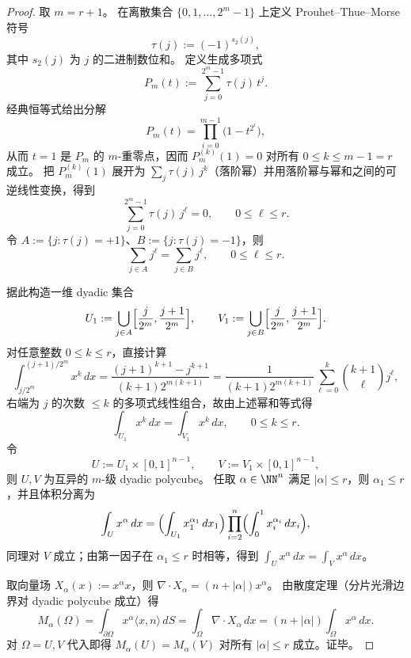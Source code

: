 \begin{proof}
取 \(m=r+1\)。
在离散集合 \(\{0,1,\dots,2^m-1\}\) 上定义 Prouhet--Thue--Morse 符号
\[
\tau(j):=(-1)^{s_2(j)},
\]
其中 \(s_2(j)\) 为 \(j\) 的二进制数位和。
定义生成多项式
\[
P_m(t):=\sum_{j=0}^{2^m-1}\tau(j)\,t^j.
\]
经典恒等式给出分解
\[
P_m(t)=\prod_{i=0}^{m-1}\bigl(1-t^{2^i}\bigr),
\]
从而 \(t=1\) 是 \(P_m\) 的 \(m\)-重零点，因而 \(P_m^{(k)}(1)=0\) 对所有 \(0\le k\le m-1=r\) 成立。
把 \(P_m^{(k)}(1)\) 展开为 \(\sum_j \tau(j)\,j^{\underline{k}}\)（落阶幂）并用落阶幂与幂和之间的可逆线性变换，得到
\[
\sum_{j=0}^{2^m-1}\tau(j)\,j^\ell=0,
\qquad 0\le \ell\le r.
\]
令 \(A:=\{j:\tau(j)=+1\}\)、\(B:=\{j:\tau(j)=-1\}\)，则
\[
\sum_{j\in A}j^\ell=\sum_{j\in B}j^\ell,\qquad 0\le \ell\le r.
\]
\par
据此构造一维 dyadic 集合
\[
U_1:=\bigcup_{j\in A}\Bigl[\frac{j}{2^m},\frac{j+1}{2^m}\Bigr],
\qquad
V_1:=\bigcup_{j\in B}\Bigl[\frac{j}{2^m},\frac{j+1}{2^m}\Bigr].
\]
对任意整数 \(0\le k\le r\)，直接计算
\[
\int_{j/2^m}^{(j+1)/2^m} x^k\,dx
=\frac{(j+1)^{k+1}-j^{k+1}}{(k+1)2^{m(k+1)}}
=\frac{1}{(k+1)2^{m(k+1)}}\sum_{\ell=0}^{k}\binom{k+1}{\ell}j^\ell,
\]
右端为 \(j\) 的次数 \(\le k\) 的多项式线性组合，故由上述幂和等式得
\[
\int_{U_1} x^k\,dx=\int_{V_1} x^k\,dx,\qquad 0\le k\le r.
\]
令
\[
U:=U_1\times[0,1]^{n-1},
\qquad
V:=V_1\times[0,1]^{n-1},
\]
则 \(U,V\) 为互异的 \(m\)-级 dyadic polycube。
任取 \(\alpha\in\NN^n\) 满足 \(|\alpha|\le r\)，则 \(\alpha_1\le r\)，并且体积分离为
\[
\int_U x^\alpha\,dx
=\Bigl(\int_{U_1} x_1^{\alpha_1}\,dx_1\Bigr)\prod_{i=2}^n\Bigl(\int_0^1 x_i^{\alpha_i}\,dx_i\Bigr),
\]
同理对 \(V\) 成立；由第一因子在 \(\alpha_1\le r\) 时相等，得到 \(\int_U x^\alpha\,dx=\int_V x^\alpha\,dx\)。
\par
取向量场 \(X_\alpha(x):=x^\alpha x\)，则 \(\nabla\cdot X_\alpha=(n+|\alpha|)x^\alpha\)。
由散度定理（分片光滑边界对 dyadic polycube 成立）得
\[
M_\alpha(\Omega)=\int_{\partial\Omega} x^\alpha\langle x,n\rangle\,dS
=\int_{\Omega}\nabla\cdot X_\alpha\,dx
=(n+|\alpha|)\int_\Omega x^\alpha\,dx.
\]
对 \(\Omega=U,V\) 代入即得 \(M_\alpha(U)=M_\alpha(V)\) 对所有 \(|\alpha|\le r\) 成立。证毕。
\end{proof}

\endinput
